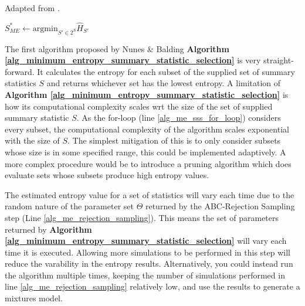 \documentclass[11pt,a4paper]{article}
\theoremstyle{break}
\begin{document}
  \begin{box_algorithm}\label{alg_minimum_entropy_summary_statistic_selection}
    Adapted from \cite[]{on_optimal_selection_of_summary_stats_for_ABC}.
    \par
    \begin{algorithm}[H]
      $S_{ME}^*\leftarrow\text{argmin}_{S'\in 2^S}\hat{H}_{S'}$\\
    \end{algorithm}
  \end{box_algorithm}

  \par The first algorithm proposed by Nunes \& Balding \textbf{Algorithm \ref{alg_minimum_entropy_summary_statistic_selection}} is very straight-forward. It calculates the entropy for each subset of the supplied set of summary statistics $S$ and returns whichever set has the lowest entropy. A limitation of \textbf{Algorithm \ref{alg_minimum_entropy_summary_statistic_selection}} is how its computational complexity scales wrt the size of the set of supplied summary statistic $S$. As the for-loop (line \ref{alg_me_sss_for_loop}) considers every subset, the computational complexity of the algorithm scales exponential with the size of $S$. The simplest mitigation of this is to only consider subsets whose size is in some specified range, this could be implemented adaptively. A more complex procedure would be to introduce a pruning algorithm which does evaluate sets whose subsets produce high entropy values.

  \par The estimated entropy value for a set of statistics will vary each time due to the random nature of the parameter set $\Theta$ returned by the ABC-Rejection Sampling step (Line \ref{alg_me_rejection_sampling}). This means the set of parameters returned by \textbf{Algorithm \ref{alg_minimum_entropy_summary_statistic_selection}} will vary each time it is executed. Allowing more simulations to be performed in this step will reduce the varability in the entropy results. Alternatively, you could instead run the algorithm multiple times, keeping the number of simulations performed in line \ref{alg_me_rejection_sampling} relatively low, and use the results to generate a mixtures model.
\end{document}
